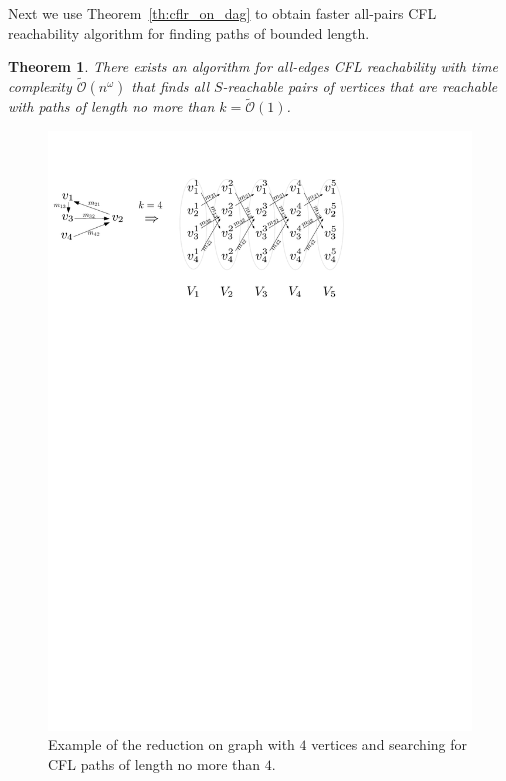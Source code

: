 \documentclass[12pt]{article}
\newtheorem{theorem}{Theorem}[section]
\begin{document}
Next we use Theorem~\ref{th:cflr_on_dag} to obtain faster all-pairs CFL reachability algorithm for finding paths of bounded length. 

\begin{theorem}\label{lemma:constant-paths}
There exists an algorithm for all-edges CFL reachability with time complexity $\tilde{\mathcal{O}}(n^{\omega})$ that finds all $S$-reachable pairs of vertices that are reachable with paths of length no more than $k = \tilde{\mathcal{O}}(1)$.
\end{theorem}

\begin{figure}[!htp]
		
	\begin{center}  
		\includegraphics[scale=1]{pictures/k-paths.pdf}
	\end{center}
	
	\caption{Example of the reduction on graph with $4$ vertices and searching for CFL paths of length no more than $4$.}
	\label{fig:k-paths}
	
\end{figure}
\end{document}
